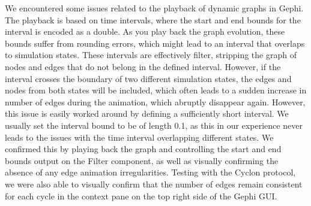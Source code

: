 We encountered some issues related to the playback of dynamic
graphs in Gephi. The playback is based on time intervals, where the
start and end bounds for the interval is encoded as a double. As you
play back the graph evolution, these bounds suffer from rounding errors,
which might lead to an interval that overlaps to simulation states.
These intervals are effectively filter, stripping the graph of nodes and
edges that do not belong in the defined interval. However, if the
interval crosses the boundary of two different simulation states, the
edges and nodes from both states will be included, which often leads to
a sudden increase in number of edges during the animation, which
abruptly disappear again. However, this issue is easily worked around by
defining a sufficiently short interval. We usually set the interval
bound to be of length 0.1, as this in our experience never leads to the
issues with the time interval overlapping different states. We confirmed
this by playing back the graph and controlling the start and end bounds
output on the Filter component, as well as visually confirming the
absence of any edge animation irregularities. Testing with the Cyclon
protocol, we were also able to visually confirm that the number of edges
remain consistent for each cycle in the context pane on the top right
side of the Gephi GUI\@.
